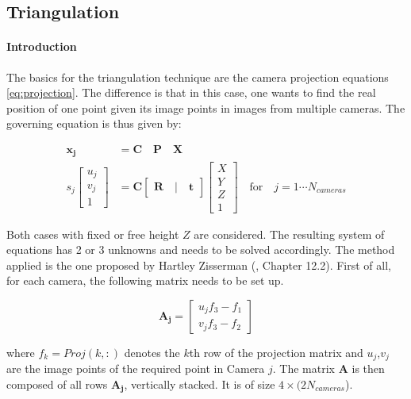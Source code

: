 \subsection{Triangulation}
\label{sec:triangulation}

\paragraph{Introduction}

The basics for the triangulation technique are the camera projection equations \eqref{eq:projection}.
The difference is that in this case, one wants to find the real position of one point given its image points in images from multiple cameras. The governing equation is thus given by:

\begin{align}
    \mathbf{x_j} & = \mathbf{C} \quad \mathbf{P} \quad     \mathbf{X} \\
    s_j \begin{bmatrix} u_j \\ v_j \\ 1 \end{bmatrix} &= 
    \mathbf{C} \begin{bmatrix} \mathbf{R} \quad|\quad \mathbf{t} \end{bmatrix}
    \begin{bmatrix} X \\ Y \\  Z \\ 1 \end{bmatrix} \quad \text{for} \quad j=1\cdots N_{cameras} 
    \label{eq:triangulation}
 \end{align}

Both cases with fixed or free height $Z$ are considered. The resulting system of equations has 2 or 3 unknowns and needs to be solved accordingly. 
The method applied is the one proposed by Hartley Zisserman (\cite{hz}, Chapter 12.2). First of all, for each camera, the following matrix needs to be set up.

\begin{equation}
    \mathbf{A_j} = \begin{bmatrix} u_j f_3-f_1 \\ v_j f_3-f_2 \end{bmatrix}
\end{equation}

where $f_k=Proj(k,:)$ denotes the $k$th row of the projection matrix and $u_j$,$v_j$ are the image points of the required point in Camera $j$.
The matrix $\mathbf{A}$ is then composed of all rows $\mathbf{A_j}$, vertically stacked. It is of size $4\times(2 N_{cameras}$).

